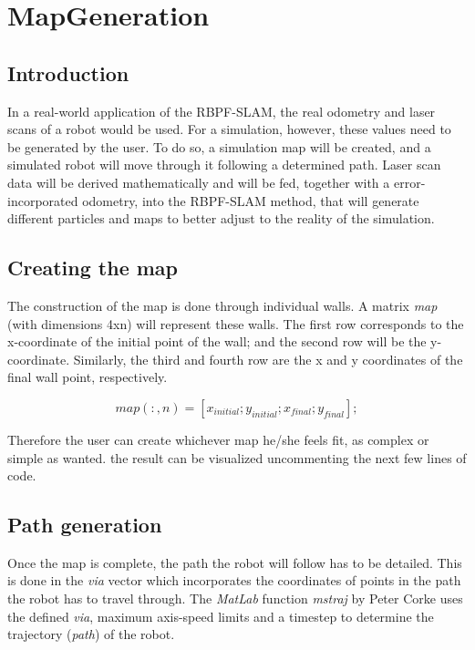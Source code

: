 \section{MapGeneration}
\subsection{Introduction}
In a real-world application of the RBPF-SLAM, the real odometry and laser scans of a robot would be used. For a simulation, however, these values need to be generated by the user. To do so, a simulation map will be created, and a simulated robot will move through it following a determined path. Laser scan data will be derived mathematically and will be fed, together with a error-incorporated odometry, into the RBPF-SLAM method, that will generate different particles and maps to better adjust to the reality of the simulation.

\subsection{Creating the map}
The construction of the map is done through individual walls. A matrix \textit{map} (with dimensions 4xn) will represent these walls. The first row corresponds to the x-coordinate of the initial point of the wall; and the second row will be the y-coordinate. Similarly, the third and fourth row are the x and y coordinates of the final wall point, respectively. 

\begin{equation}
	map(:,n) = [x_{initial}; y_{initial}; x_{final}; y_{final}];
\end{equation}

Therefore the user can create whichever map he/she feels fit, as complex or simple as wanted. the result can be visualized uncommenting the next few lines of code.

\subsection{Path generation}

Once the map is complete, the path the robot will follow has to be detailed. This is done in the \textit{via} vector which incorporates the coordinates of points in the path the robot has to travel through. The \textit{MatLab} function \textit{mstraj} by Peter Corke uses the defined \textit{via}, maximum axis-speed limits and a timestep to determine the trajectory (\textit{path}) of the robot.

